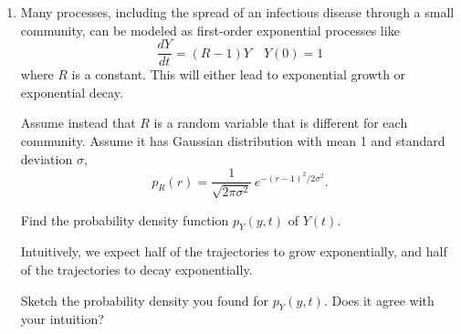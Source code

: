 \documentclass[12pt,letterpaper]{article}
\begin{document}
 

\begin{enumerate}







\item Many processes, including the spread of an infectious disease through a small community, can be modeled as first-order exponential processes like 
\begin{equation*}
\frac{dY}{dt} = \left(R-1\right) Y \quad Y(0)=1
\end{equation*}
where $R$ is a constant. This will either lead to exponential growth or exponential decay.

Assume instead that $R$ is a random variable that is different for each community. Assume it has Gaussian distribution with mean 1 and standard deviation $\sigma$,
\begin{equation*}
p_R(r) = \frac{1}{\sqrt{2\pi \sigma^2}}\, e^{-\left(r-1\right)^2/2\sigma^2}.
\end{equation*}

Find the probability density function $p_Y(y,t)$ of $Y(t)$.

Intuitively, we expect half of the trajectories to grow exponentially, and half of the trajectories to decay exponentially. 

Sketch the probability density you found for $p_Y(y,t)$. Does it agree with your intuition?


\end{enumerate}
\end{document}
